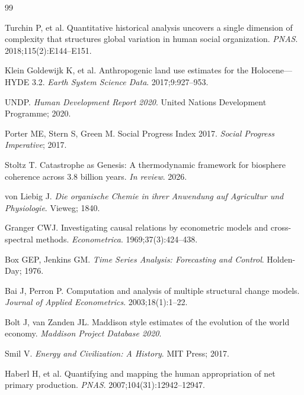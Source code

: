 \documentclass[10pt,letterpaper]{article}
\begin{document}
\begin{thebibliography}{99}

Turchin P, et al. Quantitative historical analysis uncovers a single
dimension of complexity that structures global variation in human
social organization. \emph{PNAS}. 2018;115(2):E144--E151.

Klein Goldewijk K, et al. Anthropogenic land use estimates for the
Holocene---HYDE 3.2. \emph{Earth System Science Data}. 2017;9:927--953.

UNDP. \emph{Human Development Report 2020}. United Nations Development
Programme; 2020.

Porter ME, Stern S, Green M. Social Progress Index 2017.
\emph{Social Progress Imperative}; 2017.

Stoltz T. Catastrophe as Genesis: A thermodynamic framework for
biosphere coherence across 3.8 billion years. \emph{In review}. 2026.

von Liebig J. \emph{Die organische Chemie in ihrer Anwendung auf
Agricultur und Physiologie}. Vieweg; 1840.

Granger CWJ. Investigating causal relations by econometric models and
cross-spectral methods. \emph{Econometrica}. 1969;37(3):424--438.

Box GEP, Jenkins GM. \emph{Time Series Analysis: Forecasting and Control}.
Holden-Day; 1976.

Bai J, Perron P. Computation and analysis of multiple structural change
models. \emph{Journal of Applied Econometrics}. 2003;18(1):1--22.

Bolt J, van Zanden JL. Maddison style estimates of the evolution of the
world economy. \emph{Maddison Project Database 2020}.

Smil V. \emph{Energy and Civilization: A History}. MIT Press; 2017.

Haberl H, et al. Quantifying and mapping the human appropriation of net
primary production. \emph{PNAS}. 2007;104(31):12942--12947.

\end{thebibliography}
\end{document}
